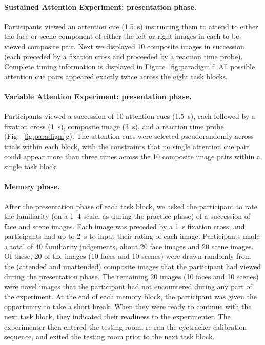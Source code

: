 \documentclass[english]{article}
\begin{document}
\paragraph*{Sustained Attention Experiment: presentation phase.} Participants viewed an attention cue (1.5~s) instructing them to attend to either the face or scene component of either the left or right images in each to-be-viewed composite pair.  Next we displayed 10 composite images in succession (each preceded by a fixation cross and proceeded by a reaction time probe).  Complete timing information is displayed in Figure~\ref{fig:paradigm}f.  All possible attention cue pairs appeared exactly twice across the eight task blocks.

\paragraph*{Variable Attention Experiment: presentation phase.}  Participants viewed a succession of 10 attention cues (1.5~s), each followed by a fixation cross (1~s), composite image (3~s), and a reaction time probe (Fig.~\ref{fig:paradigm}g).  The attention cues were selected pseudorandomly across trials within each block, with the constraints that no single attention cue pair could appear more than three times across the 10 composite image pairs within a single task block.

\paragraph*{Memory phase.} After the presentation phase of each task block, we asked the participant to rate the familiarity (on a 1--4 scale, as during the practice phase) of a succession of face and scene images.  Each image was preceded by a 1~s fixation cross, and participants had up to 2~s to input their rating of each image.  Participants made a total of 40 familiarity judgements, about 20 face images and 20 scene images.  Of these, 20 of the images (10 faces and 10 scenes) were drawn randomly from the (attended and unattended) composite images that the participant had viewed during the presentation phase.  The remaining 20 images (10 faces and 10 scenes) were novel images that the participant had not encountered during any part of the experiment.  At the end of each memory block, the participant was given the opportunity to take a short break.  When they were ready to continue with the next task block, they indicated their readiness to the experimenter.  The experimenter then entered the testing room, re-ran the eyetracker calibration sequence, and exited the testing room prior to the next task block.
\end{document}
